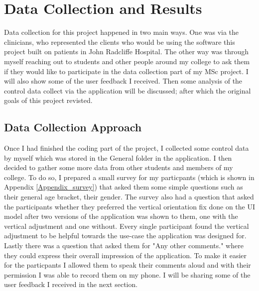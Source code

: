 \chapter{Data Collection and Results}

\label{Chapter7_dataCollectionResults} 

Data collection for this project happened in two main ways. One was via the clinicians, who represented the clients who would be using the software this project built on patients in John Radcliffe Hospital. The other way was through myself reaching out to students and other people around my college to ask them if they would like to participate in the data collection part of my MSc project. I will also show some of the user feedback I received. Then some analysis of the control data collect via the application will be discussed; after which the original goals of this project revisted. 

\section{Data Collection Approach}

Once I had finished the coding part of the project, I collected some control data by myself which was stored in the General folder in the application. I then decided to gather some more data from other students and members of my college. To do so, I prepared a small survey for my particpants (which is shown in Appendix \ref{Appendix_survey}) that asked them some simple questions such as their general age bracket, their gender. The survey also had a question that asked the participants whether they preferred the vertical orientation fix done on the UI model after two versions of the application was shown to them, one with the vertical adjustment and one without. Every single participant found the vertical adjustment to be helpful towards the use-case the application was designed for. Lastly there was a question that asked them for "Any other comments." where they could express their overall impression of the application. To make it easier for the particpants I allowed them to speak their comments aloud and with their permission I was able to record them on my phone. I will be sharing some of the user feedback I received in the next section. 


